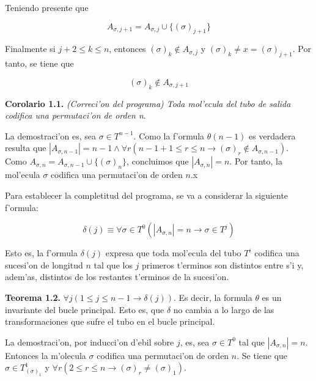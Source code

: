 \documentclass[12pt]{article}
\begin{document}
Teniendo presente que

\begin{equation*}
    A_{\sigma,j+1} = A_{\sigma,j} \cup \{(\sigma)_{j+1}\}
\end{equation*}

Finalmente si $j + 2 \leq k \leq n $, entonces $(\sigma)_{k} \notin A_{\sigma,j}$ y $(\sigma)_{k} \neq x = (\sigma)_{j+1}$.
Por tanto, se tiene que

\begin{equation*}
    (\sigma)_{k} \notin A_{\sigma,j+1}
\end{equation*}



\textbf{Corolario 1.1.} \textit{(Correci'on del programa) Toda mol'ecula del tubo de salida codifica una permutaci'on de
orden n}.

La demostraci'on es, sea $\sigma \in T^{n-1}$. Como la f'ormula $\theta(n-1)$ es verdadera resulta que
$|A_{\sigma,n-1}| = n - 1 \land \forall r (n - 1 + 1 \leq r \leq n \longrightarrow (\sigma)_{r} \notin A_{\sigma,n-1})$.
Como $A_{\sigma,n} = A_{\sigma,n-1} \cup \{(\sigma)_{n}\}$, concluimos que $|A_{\sigma,n}| = n$. Por tanto, la mol'ecula
$\sigma$ codifica una permutaci'on de orden $n$.x

Para establecer la completitud del programa, se va a considerar la siguiente f'ormula:

\begin{equation*}
  \delta(j) \equiv \forall \sigma \in T^{0} (|A_{\sigma,n}| = n \longrightarrow \sigma \in T^{j})
\end{equation*}

Esto es, la f'ormula $\delta(j)$ expresa que toda mol'ecula del tubo $T^{i}$ codifica una sucesi'on de longitud $n$ tal que
los $j$ primeros t'erminos son distintos entre s'i y, adem'as, distintos de los restantes t'erminos de la sucesi'on.

\textbf{Teorema 1.2.} $\forall j (1 \leq j \leq n-1 \longrightarrow \delta(j))$. Es decir, la formula $\theta$ es un invariante del
bucle principal. Esto es, que $\delta$ no cambia a lo largo de las transformaciones que sufre el tubo en el bucle principal.

La demostraci'on, por inducci'on d'ebil sobre $j$, es, sea $\sigma \in  T^{0}$ tal que $|A_{\sigma,n}| = n$. Entonces
la m'olecula $\sigma$ codifica una permutaci'on de orden $n$. Se tiene que $\sigma \in T_{(\sigma)_{1}}^{1}$ y
$\forall r (2 \leq r \leq n \longrightarrow (\sigma)_{r} \neq (\sigma)_{1})$.
\end{document}
